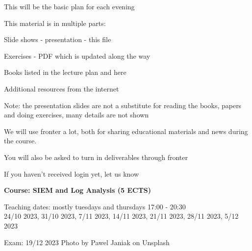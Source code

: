 \documentclass[Screen16to9,17pt]{foils}
\begin{document}
\vskip 1cm
\centerline{\Large This will be the basic plan for each evening}




\begin{list1}
\item This material is in multiple parts:
\begin{list2}
\item Slide shows - presentation - this file
\item Exercises - PDF which is updated along the way
\item Books listed in the lecture plan and here
\item Additional resources from the internet
\end{list2}
\item Note: the presentation slides are not a substitute for reading the books, papers and doing exercises, many details are not shown
\end{list1}





We will use fronter a lot, both for sharing educational materials and news during the course.

You will also be asked to turn in deliverables through fronter


\vskip 5mm
\centerline{If you haven't received login yet, let us know}








{\Large\bf Course: SIEM and Log Analysis (5 ECTS)}

Teaching dates: mostly tuesdays and thursdays 17:00 - 20:30\\
24/10 2023, 31/10 2023, 7/11 2023, 14/11 2023, 21/11 2023, 28/11 2023, 5/12 2023

Exam: 19/12 2023 \hskip 12cm Photo by Pawel Janiak on Unsplash

\end{document}
